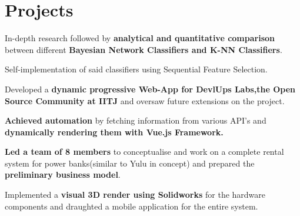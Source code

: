 \documentclass[]{deedy-resume-openfont}
\begin{document}
\begin{minipage}[t]{0.69\textwidth}
\section{Projects}
\begin{tightemize}
\item In-depth research followed by \textbf{analytical and quantitative comparison} between different \textbf{Bayesian Network Classifiers and K-NN Classifiers}.
\item Self-implementation of said classifiers using Sequential Feature Selection.
\end{tightemize}
{}
\begin{tightemize}
\item Developed a \textbf{dynamic progressive Web-App for DevlUps Labs,the Open Source Community at IITJ} and oversaw future extensions on the project. 
\item \textbf{Achieved automation} by fetching information from various API's and \textbf{dynamically rendering them with Vue.js Framework.}
\end{tightemize}
{}
\begin{tightemize}
\item \textbf{Led a team of 8 members} to conceptualise and work on a complete rental system for power banks(similar to Yulu in concept) and prepared the \textbf{preliminary business model}.
\item Implemented a \textbf{visual 3D render using Solidworks} for the hardware components and draughted a mobile application for the entire system.
\end{tightemize}



\end{minipage}
\end{document}

